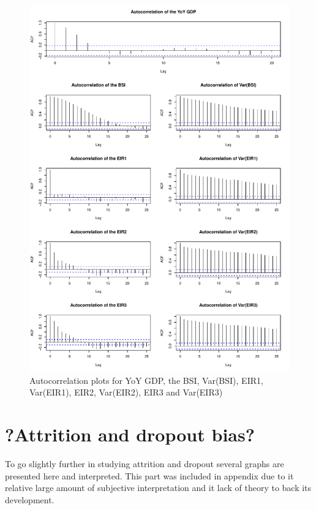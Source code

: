 \documentclass{article}[]
\begin{document}
\begin{figure}[!htbp]
    \centering
    \includegraphics[scale=0.75]{Graphs/ACF.pdf}
    \caption{Autocorrelation plots for YoY GDP, the BSI, Var(BSI), EIR1, Var(EIR1), EIR2, Var(EIR2), EIR3 and Var(EIR3)}
    \label{fig:ACF}
\end{figure}




\newpage
\section{?Attrition and dropout bias?}

To go slightly further in studying attrition and dropout several graphs are presented here and interpreted. 
This part was included in appendix due to it relative large amount of subjective interpretation and it lack of theory to back its development.
\end{document}

